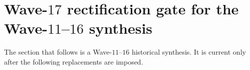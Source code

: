 
\providecommand{\ClaimStatusTheorem}{\textsc{[Theorem]}}
\providecommand{\ClaimStatusConjectured}{\textsc{[Conjectured]}}
\providecommand{\ClaimStatusCorrected}{\textsc{[Corrected]}}
\providecommand{\ClaimStatusOpen}{\textsc{[Open]}}
\providecommand{\ClaimStatusRetracted}{\textsc{[Retracted]}}
\providecommand{\ClaimStatusDefinition}{\textsc{[Definition]}}
\providecommand{\kBKM}{\kappa_{\mathrm{BKM}}}
\providecommand{\kch}{\kappa_{\mathrm{ch}}}
\providecommand{\kcat}{\kappa_{\mathrm{cat}}}
\providecommand{\kfib}{\kappa_{\mathrm{fiber}}}
\providecommand{\kanom}{\kappa_{\mathrm{anom}}}
\providecommand{\ZZ}{\mathbb{Z}}
\providecommand{\CC}{\mathbb{C}}
\providecommand{\CYcat}{\mathrm{CY}\text{-cat}}
\providecommand{\ChirAlg}{\mathrm{ChirAlg}}
\providecommand{\HolFA}{\mathrm{HolFA}}
\providecommand{\hCS}{\mathrm{hCS}}
\providecommand{\Obs}{\mathrm{Obs}}
\providecommand{\CE}{\mathrm{CE}}
\providecommand{\chir}{\mathrm{chir}}
\providecommand{\Sp}{\mathrm{Sp}}
\providecommand{\cE}{\mathcal{E}}
\providecommand{\cO}{\mathcal{O}}
\providecommand{\cF}{\mathcal{F}}
\providecommand{\fg}{\mathfrak{g}}
\providecommand{\Yplus}{Y^+_{\epsilon_1,\epsilon_2}}
\providecommand{\CoHA}{\mathrm{CoHA}}
\providecommand{\Winf}{\mathcal{W}_{1+\infty}}
\providecommand{\Mtf}{M_{24}}
\providecommand{\bH}{\mathbf{H}}

\section{Wave-$17$ rectification gate for the Wave-$11$--$16$ synthesis}
\label{wn:sec:wave17-rectification-gate}

\noindent
The section that follows is a Wave-$11$--$16$ historical synthesis.  It is
current only after the following replacements are imposed.

